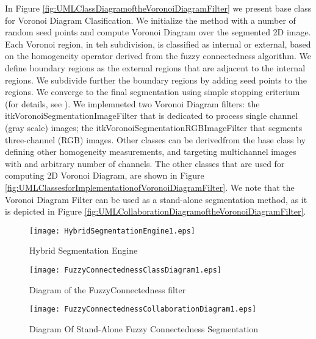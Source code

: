 In Figure \ref{fig:UMLClassDiagramoftheVoronoiDiagramFilter} we present base class for Voronoi
Diagram Clasification. We initialize the method with a number of random seed points and compute
Voronoi Diagram over the segmented 2D image. Each Voronoi region, in teh subdivision,
is classified as internal
or external, based on the homogeneity operator derived from the fuzzy connectedness algorithm.
We define boundary regions as the external regions that are adjacent to the internal regions. 
We subdivide further the boundary regions by adding seed points to
the regions. We converge to the final segmentation using simple stopping criterium (for details,
see \cite{Imielinska2001}). We implemneted two Voronoi Diagram filters:
the itkVoronoiSegmentationImageFilter that is dedicated to process single
channel (gray scale) images; the itkVoronoiSegmentationRGBImageFilter that segments three-channel
(RGB) images. Other classes can be derivedfrom the base class by defining other homogeneity
measurements, and targeting multichannel images with and arbitrary number of channels.
The other classes that are used for computing 2D Voronoi Diagram, are shown in Figure \ref{fig:UMLClassesforImplementationofVoronoiDiagramFilter}. We note that the Voronoi Diagram
Filter can be used as a stand-alone segmentation method, as it is depicted in Figure
\ref{fig:UMLCollaborationDiagramoftheVoronoiDiagramFilter}.


%
%
%

\begin{figure}
\center
\texttt{[image: HybridSegmentationEngine1.eps]}
\caption{Hybrid Segmentation Engine}
\label{fig:ComponentsofaHybridSegmentationApproach}
\end{figure}


\begin{figure}
\center
\texttt{[image: FuzzyConnectednessClassDiagram1.eps]}
\caption{Diagram of the FuzzyConnectedness filter}
\label{fig:UMLClassDiagramoftherFuzzyConnectednessFilter}
\end{figure}


\begin{figure}
\center
\texttt{[image: FuzzyConnectednessCollaborationDiagram1.eps]}
\caption{Diagram Of Stand-Alone Fuzzy Connectedness Segmentation}
\label{fig:UMLCollaborationDiagramoftherFuzzyConnectednessFilter}
\end{figure}

